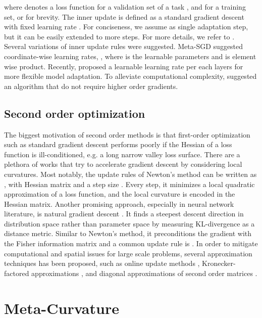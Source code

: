 \documentclass{article}
\begin{document}
where  denotes a loss function for a validation set of a task , and  for a training set, or  for brevity. The inner update is defined as a standard gradient descent with fixed learning rate . For conciseness, we assume as single adaptation step, but it can be easily extended to more steps. For more details, we refer to \cite{Finn-icml-2017}. Several variations of inner update rules were suggested. Meta-SGD \cite{Li-arxiv-2017} suggested coordinate-wise learning rates, , where  is the learnable parameters and  is element wise product. Recently, \cite{Antoniou-arxiv-2018} proposed a learnable learning rate per each layers for more flexible model adaptation. To alleviate computational complexity, \cite{Nichol-arxiv-2018} suggested an algorithm that do not require higher order gradients.


\subsection{Second order optimization}
The biggest motivation of second order methods is that first-order optimization such as standard gradient descent performs poorly if the Hessian of a loss function is ill-conditioned, e.g. a long narrow valley loss surface. There are a plethora of works that try to accelerate gradient descent by considering local curvatures. Most notably, the update rules of Newton's method can be written as , with Hessian matrix  and a step size  \cite{Nocedal_2006}. Every step, it minimizes a local quadratic approximation of a loss function, and the local curvature is encoded in the Hessian matrix. Another promising approach, especially in neural network literature, is natural gradient descent \cite{Amari}. It finds a steepest descent direction in distribution space rather than parameter space by measuring KL-divergence as a distance metric. Similar to Newton's method, it preconditions the gradient with the Fisher information matrix and a common update rule is . In order to mitigate computational and spatial issues for large scale problems, several approximation techniques has been proposed, such as online update methods \cite{Nocedal_2006, LeRoux-2008}, Kronecker-factored approximations \cite{Martens-icml-2015}, and diagonal approximations of second order matrices \cite{rmsprop,adam,adagrad}.

\section{Meta-Curvature}
\label{meta_curvature}
\end{document}
